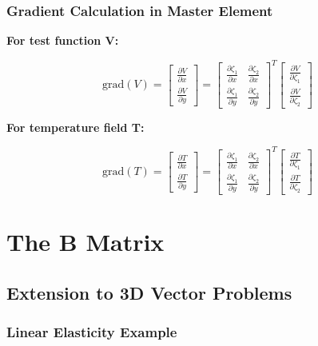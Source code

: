\documentclass[
  11pt,
  a4paper,
]{scrbook}
\begin{document}
\subsection{Gradient Calculation in Master
Element}\label{gradient-calculation-in-master-element}

\textbf{For test function V:}

\[\text{grad}(V) = \begin{bmatrix} \frac{\partial V}{\partial x} \\ \frac{\partial V}{\partial y} \end{bmatrix} = \begin{bmatrix} \frac{\partial \zeta_1}{\partial x} & \frac{\partial \zeta_2}{\partial x} \\ \frac{\partial \zeta_1}{\partial y} & \frac{\partial \zeta_2}{\partial y} \end{bmatrix}^T \begin{bmatrix} \frac{\partial V}{\partial \zeta_1} \\ \frac{\partial V}{\partial \zeta_2} \end{bmatrix}\]

\textbf{For temperature field T:}

\[\text{grad}(T) = \begin{bmatrix} \frac{\partial T}{\partial x} \\ \frac{\partial T}{\partial y} \end{bmatrix} = \begin{bmatrix} \frac{\partial \zeta_1}{\partial x} & \frac{\partial \zeta_2}{\partial x} \\ \frac{\partial \zeta_1}{\partial y} & \frac{\partial \zeta_2}{\partial y} \end{bmatrix}^T \begin{bmatrix} \frac{\partial T}{\partial \zeta_1} \\ \frac{\partial T}{\partial \zeta_2} \end{bmatrix}\]

\chapter{The B Matrix}\label{the-b-matrix}

\section{Extension to 3D Vector
Problems}\label{extension-to-3d-vector-problems}

\subsection{Linear Elasticity Example}\label{linear-elasticity-example}
\end{document}
